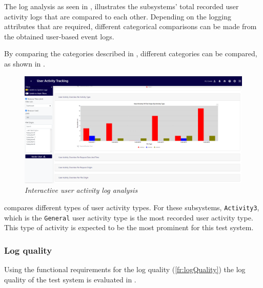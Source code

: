 The log analysis as seen in , illustrates the subsystems' total recorded user activity logs that are compared to each other. Depending on the logging attributes that are required, different categorical comparisons can be made from the obtained user-based event logs. \par By comparing the categories described in , different categories can be compared, as shown in . 

\begin{figure}[!htb]
	\centering %
	\includegraphics[width=0.99\linewidth]{img/ch3/analysis/UAT_menu_activities.png}
	\caption[Interactive user activity log analysis]
	{\textit{Interactive user activity log analysis}}\label{fig:ch3_UAT_menuActivities}
\end{figure}

 compares different types of user activity types. For these subsystems, \texttt{Activity3}, which is the \texttt{General} user activity type is the most recorded user activity type. This type of activity is expected to be the most prominent for this test system.  

\subsubsection{Log quality}
Using the functional requirements for the log quality (\ref{fr:logQuality}) the log quality of the test system is evaluated in .

